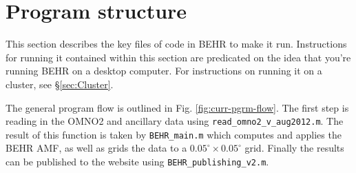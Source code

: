 \documentclass[12pt]{article}
\begin{document}
\section{Program structure}
	This section describes the key files of code in BEHR to make it run.  Instructions for running it contained within this section are predicated on the idea that you're running BEHR on a desktop computer.  For instructions on running it on a cluster, see \S\ref{sec:Cluster}.
	
	The general program flow is outlined in Fig. \ref{fig:curr-pgrm-flow}. The first step is reading in the OMNO2 and ancillary data using \lstinline$read_omno2_v_aug2012.m$. The result of this function is taken by \lstinline$BEHR_main.m$ which computes and applies the BEHR AMF, as well as grids the data to a $0.05^\circ \times 0.05^\circ$ grid. Finally the results can be published to the website using \lstinline$BEHR_publishing_v2.m$.
\end{document}
